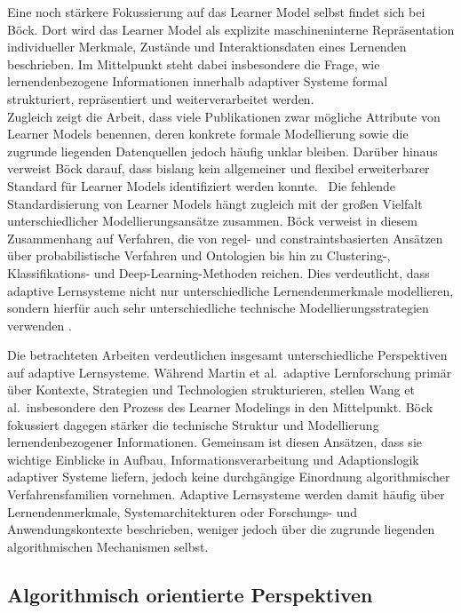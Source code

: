 Eine noch stärkere Fokussierung auf das Learner Model selbst findet sich
bei Böck. Dort wird das Learner Model als explizite maschineninterne
Repräsentation individueller Merkmale, Zustände und Interaktionsdaten
eines Lernenden beschrieben. Im Mittelpunkt steht dabei insbesondere die
Frage, wie lernendenbezogene Informationen innerhalb adaptiver Systeme
formal strukturiert, repräsentiert und weiterverarbeitet werden.\\
Zugleich zeigt die Arbeit, dass viele Publikationen zwar mögliche
Attribute von Learner Models benennen, deren konkrete formale
Modellierung sowie die zugrunde liegenden Datenquellen jedoch häufig
unklar bleiben. Darüber hinaus verweist Böck darauf, dass bislang kein
allgemeiner und flexibel erweiterbarer Standard für Learner Models
identifiziert werden konnte.~ Die fehlende Standardisierung von Learner
Models hängt zugleich mit der großen Vielfalt unterschiedlicher
Modellierungsansätze zusammen. Böck verweist in diesem Zusammenhang auf
Verfahren, die von regel- und constraintsbasierten Ansätzen über
probabilistische Verfahren und Ontologien bis hin zu Clustering-,
Klassifikations- und Deep-Learning-Methoden reichen. Dies verdeutlicht,
dass adaptive Lernsysteme nicht nur unterschiedliche Lernendenmerkmale
modellieren, sondern hierfür auch sehr unterschiedliche technische
Modellierungsstrategien verwenden \citep{Boeck2025}.

Die betrachteten Arbeiten verdeutlichen insgesamt unterschiedliche
Perspektiven auf adaptive Lernsysteme. Während Martin et al.~adaptive
Lernforschung primär über Kontexte, Strategien und Technologien
strukturieren, stellen Wang et al.~insbesondere den Prozess des Learner
Modelings in den Mittelpunkt. Böck fokussiert dagegen stärker die
technische Struktur und Modellierung lernendenbezogener Informationen.
Gemeinsam ist diesen Ansätzen, dass sie wichtige Einblicke in Aufbau,
Informationsverarbeitung und Adaptionslogik adaptiver Systeme liefern,
jedoch keine durchgängige Einordnung algorithmischer Verfahrensfamilien
vornehmen. Adaptive Lernsysteme werden damit häufig über
Lernendenmerkmale, Systemarchitekturen oder Forschungs- und
Anwendungskontexte beschrieben, weniger jedoch über die zugrunde
liegenden algorithmischen Mechanismen selbst.

\subsection{Algorithmisch orientierte
Perspektiven}\label{algorithmisch-orientierte-perspektiven}

